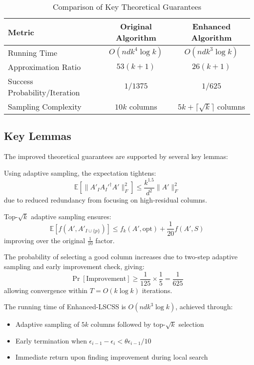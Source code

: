 \documentclass{article}
\begin{document}
\begin{table}[H]
\centering
\caption{Comparison of Key Theoretical Guarantees}
\begin{tabular}{lcc}
\toprule
\textbf{Metric} & \textbf{Original Algorithm} & \textbf{Enhanced Algorithm} \\
\midrule
Running Time & $O(ndk^4 \log k)$ & $O(ndk^3 \log k)$ \\
Approximation Ratio & $53(k+1)$ & $26(k+1)$ \\
Success Probability/Iteration & $1/1375$ & $1/625$ \\
Sampling Complexity & $10k$ columns & $5k + \lceil \sqrt{k} \rceil$ columns \\
\bottomrule
\end{tabular}
\end{table}

\subsection{Key Lemmas}
The improved theoretical guarantees are supported by several key lemmas:

\begin{lemma}
Using adaptive sampling, the expectation tightens:
\[
\mathbb{E}\left[\|A'_I A_I'^\dagger A'\|_F^2\right] \leq \frac{k^{1.5}}{d^2} \|A'\|_F^2
\]
due to reduced redundancy from focusing on high-residual columns.
\end{lemma}

\begin{lemma}
Top-$\sqrt{k}$ adaptive sampling ensures:
\[
\mathbb{E}[f(A', A'_{I \cup \{p\}})] \leq f_k(A', \text{opt}) + \frac{1}{20}f(A', S)
\]
improving over the original $\frac{1}{10}$ factor.
\end{lemma}

\begin{lemma}
The probability of selecting a good column increases due to two-step adaptive sampling and early improvement check, giving:
\[
\Pr[\text{Improvement}] \geq \frac{1}{125} \times \frac{1}{5} = \frac{1}{625}
\]
allowing convergence within $T = O(k \log k)$ iterations.
\end{lemma}

\begin{lemma}
The running time of Enhanced-LSCSS is $O(ndk^3 \log k)$, achieved through:
\begin{itemize}
    \item Adaptive sampling of $5k$ columns followed by top-$\sqrt{k}$ selection
    \item Early termination when $\epsilon_{i-1} - \epsilon_i < \theta\epsilon_{i-1}/10$
    \item Immediate return upon finding improvement during local search
\end{itemize}
\end{lemma}
\end{document}
